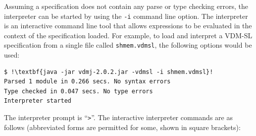 \documentclass{overturerepchap}
\begin{document}
Assuming a specification does not contain any parse or type checking errors, the interpreter can be
started by using the \texttt{-i} command line option.
The interpreter is an interactive command line tool that allows expressions to be evaluated in the
context of the specification loaded. For example, to load and interpret a
VDM-SL specification from a single file called \texttt{shmem.vdmsl},
the following options would be used:

\begin{lstlisting}
$ !\textbf{java -jar vdmj-2.0.2.jar -vdmsl -i shmem.vdmsl}!
Parsed 1 module in 0.266 secs. No syntax errors
Type checked in 0.047 secs. No type errors
Interpreter started
\end{lstlisting}

The interpreter prompt is ``\texttt{>}''. The 
interactive interpreter commands are as follows (abbreviated forms are
permitted for some, shown in square brackets): 
\end{document}

